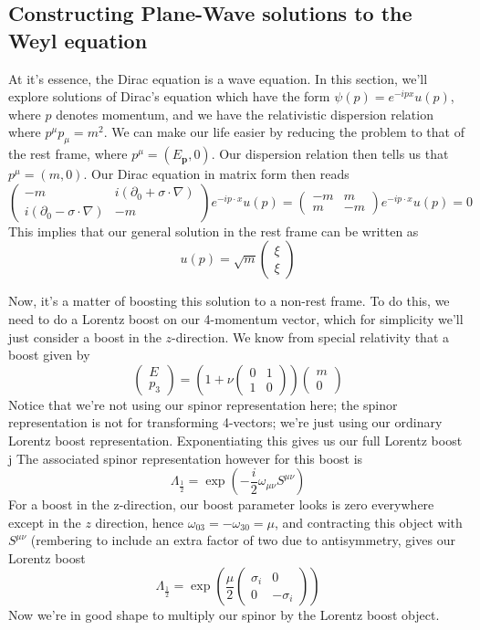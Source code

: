 \subsection{Constructing Plane-Wave solutions to the Weyl equation} 
At it's essence, the Dirac equation is a wave equation. In this section, we'll explore solutions of Dirac's equation which have the form $\psi(p )  = e^{ - i p x } u ( p ) $, where $p$ denotes momentum, and we have the relativistic dispersion relation where $p^\mu p_\mu = m^2 $. We can make our life easier by reducing the problem to that of the rest frame, where $p^\mu  = (E_\mathbf{p} , 0 ) $. Our dispersion relation then tells us that $p^\mu = (m,  0 )$. Our Dirac equation in matrix form then reads \[ 
\begin{pmatrix}  - m & i ( \partial_0  + \sigma \cdot \nabla ) \\ 
i ( \partial_0  - \sigma \cdot \nabla ) & -m 
\end{pmatrix} e^{ - i p \cdot x } u(  p )  = \begin{pmatrix} -m & m \\ m & -m \end{pmatrix} e^{  - i p \cdot x } u(p)  = 0 
\] 
This implies that our general solution in the rest frame can be written as \[ u(p)  = \sqrt{m} \begin{pmatrix} \xi \\ \xi \end{pmatrix} \] 

Now, it's a matter of boosting this solution to a non-rest frame. To do this, we need to do a Lorentz boost on our 4-momentum vector, which for simplicity we'll just consider a boost in the $z$-direction. We know from special relativity that a boost given by 
\[ 
\begin{pmatrix} 
E \\ p_3 
\end{pmatrix}  = \left(  1 + \nu \begin{pmatrix} 0 & 1 \\ 1 & 0 \end{pmatrix} \right)  \begin{pmatrix} m \\ 0 \end{pmatrix} \] 
Notice that we're not using our spinor representation here; the spinor representation is not for transforming 4-vectors; we're just using our ordinary Lorentz boost representation. Exponentiating this gives us our full Lorentz boost j The associated spinor representation however for this boost is 
\[
\Lambda_{\frac{1}{2}} = \exp \left(  - \frac{i}{2} \omega_{ \mu \nu } S^{\mu \nu} \right) 
\]
For a boost in the z-direction, our boost parameter looks is zero everywhere except in the $z$ direction, hence $\omega_{03}  = - \omega_{30}  = \mu$, and contracting this object with $S^{ \mu \nu} $ (rembering to include an extra factor of two due to antisymmetry, gives our Lorentz boost \[ 
\Lambda_{\frac{1}{ 2}} = \exp \left(  \frac{ \mu}{ 2} \begin{pmatrix} \sigma_i & 0 \\ 0 &  -\sigma_i \end{pmatrix} \right)  \] 
Now we're in good shape to multiply our spinor by the Lorentz boost object.  


\pagebreak 
